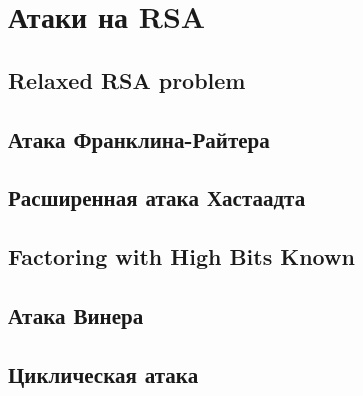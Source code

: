 \section{Атаки на RSA}

\subsection{Relaxed RSA problem}

\subsection{Атака Франклина-Райтера}

\subsection{Расширенная атака Хастаадта}

\subsection{Factoring with High Bits Known}

\subsection{Атака Винера}

\subsection{Циклическая атака}